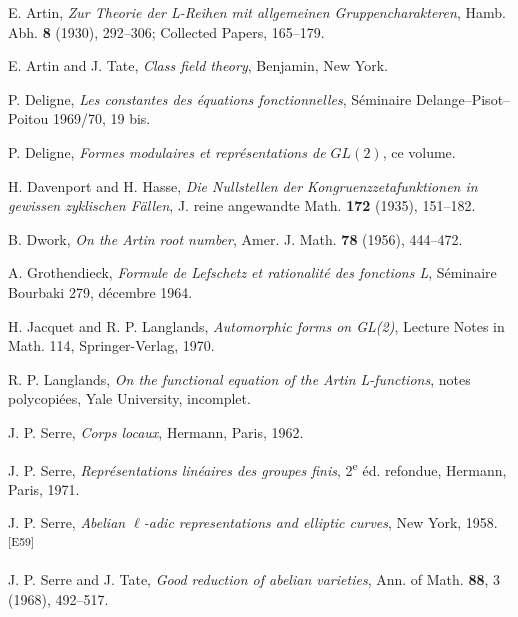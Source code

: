\documentclass[10pt,letterpaper]{article}
\newcommand{\auditmark}[1]{\textsuperscript{\normalfont\scriptsize[E#1]}}
\begin{document}
\begin{enumerate}[label={[\arabic*]},leftmargin=2.8em]
\item E. Artin, \emph{Zur Theorie der L-Reihen mit allgemeinen Gruppencharakteren}, Hamb. Abh. \textbf{8} (1930), 292--306; Collected Papers, 165--179.
\item E. Artin and J. Tate, \emph{Class field theory}, Benjamin, New York.
\item P. Deligne, \emph{Les constantes des équations fonctionnelles}, Séminaire Delange--Pisot--Poitou 1969/70, 19 bis.
\item P. Deligne, \emph{Formes modulaires et représentations de \(GL(2)\)}, ce volume.
\item H. Davenport and H. Hasse, \emph{Die Nullstellen der Kongruenzzetafunktionen in gewissen zyklischen Fällen}, J. reine angewandte Math. \textbf{172} (1935), 151--182.
\item B. Dwork, \emph{On the Artin root number}, Amer. J. Math. \textbf{78} (1956), 444--472.
\item A. Grothendieck, \emph{Formule de Lefschetz et rationalité des fonctions L}, Séminaire Bourbaki 279, décembre 1964.
\item H. Jacquet and R. P. Langlands, \emph{Automorphic forms on GL(2)}, Lecture Notes in Math. 114, Springer-Verlag, 1970.
\item R. P. Langlands, \emph{On the functional equation of the Artin L-functions}, notes polycopiées, Yale University, incomplet.
\item J. P. Serre, \emph{Corps locaux}, Hermann, Paris, 1962.
\item J. P. Serre, \emph{Représentations linéaires des groupes finis}, 2\textsuperscript{e} éd. refondue, Hermann, Paris, 1971.
\item J. P. Serre, \emph{Abelian \(\ell\)-adic representations and elliptic curves}, New York, 1958.\auditmark{59}
\item J. P. Serre and J. Tate, \emph{Good reduction of abelian varieties}, Ann. of Math. \textbf{88}, 3 (1968), 492--517.


\end{enumerate}
\end{document}
